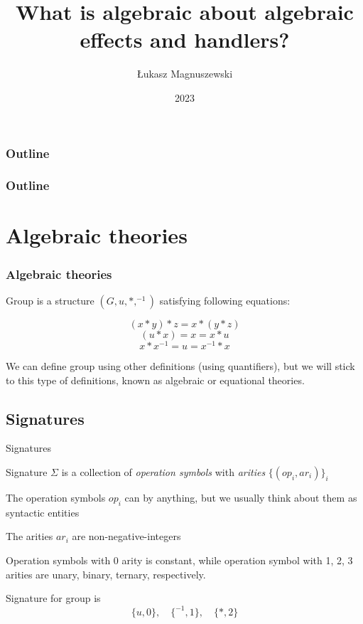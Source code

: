 \documentclass{beamer}
\title{What is algebraic about algebraic effects and handlers?}
\author{Łukasz Magnuszewski}
\date{2023}
\begin{document}
\frame{\titlepage}

\begin{frame}
\frametitle{Outline}
\tableofcontents[sections=1-2]
\end{frame}
\begin{frame}
    \frametitle{Outline}
    \tableofcontents[sections=3-5]
    \end{frame}
    

\section{Algebraic theories}

\begin{frame}
\frametitle{Algebraic theories}

\begin{example}
    Group is a structure $(G, u, *, ^{-1})$ satisfying following equations:

   \[
    (x * y) * z = x * (y * z) 
   \]
   \[
    (u * x) = x = x * u 
   \]
   \[
    x * x^{-1} = u = x^{-1} * x
   \]
        
    
\end{example}
We can define group using other definitions (using quantifiers), 
but we will stick to this type of definitions, known as algebraic or equational theories.

\end{frame}

\subsection{Signatures}

\begin{frame}{Signatures}
    \begin{definition}
        Signature $\Sigma$ is a collection of \textit{operation symbols} with \textit{arities}
        $\{(op_i, ar_i)\}_i$
       
        
        The operation symbols $op_i$ can by anything, 
          but we usually think about them as syntactic entities
        
        
        The arities $ar_i$ are non-negative-integers


        
    \end{definition}
    
    Operation symbols with 0 arity is constant, while operation symbol with 1, 2, 3 arities are
    unary, binary, ternary, respectively. 

    
    \begin{example}
        Signature for group is 
        \[
          \{ u, 0 \}, \quad \{ ^{-1}, 1 \}, \quad \{ *, 2 \} 
        \]
    \end{example}

\end{frame}
\end{document}
